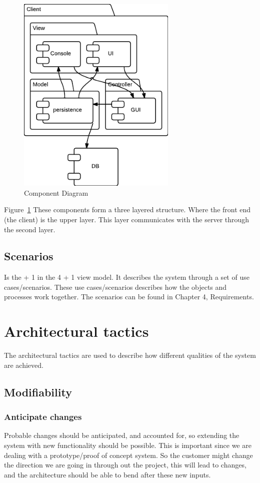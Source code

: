 \begin{figure}[h]
\centering
\includegraphics[width=3in]{image/architecture/ComponentDiagram.png}
\caption{Component Diagram}
\label{figure:ComponentDiagram}
\end{figure}

Figure~\ref{figure:ComponentDiagram} These components form a three layered structure. Where the front end (the client) is the upper layer. This layer communicates with the server through the second layer.


\subsection{Scenarios}
Is the + 1 in the 4 + 1 view model. It describes the system through a set of use cases/scenarios. These use cases/scenarios describes how the objects and processes work together. The scenarios can be found in Chapter 4, Requirements.


\section{Architectural tactics} \label{Tactics}
The architectural tactics are used to describe how different qualities of the system are achieved. 

\subsection{Modifiability}
\subsubsection{Anticipate changes}
Probable changes should be anticipated, and accounted for, so extending the system with new functionality should be possible. This is important since we are dealing with a prototype/proof of concept system. So the customer might change the direction we are going in through out the project, this will lead to changes, and the architecture should be able to bend after these new inputs. 

